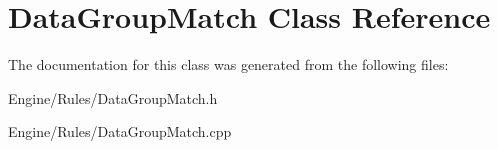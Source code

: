 \hypertarget{classDataGroupMatch}{}\section{Data\+Group\+Match Class Reference}
\label{classDataGroupMatch}


The documentation for this class was generated from the following files\+:\begin{DoxyCompactItemize}
\item 
Engine/\+Rules/Data\+Group\+Match.\+h\item 
Engine/\+Rules/Data\+Group\+Match.\+cpp\end{DoxyCompactItemize}
